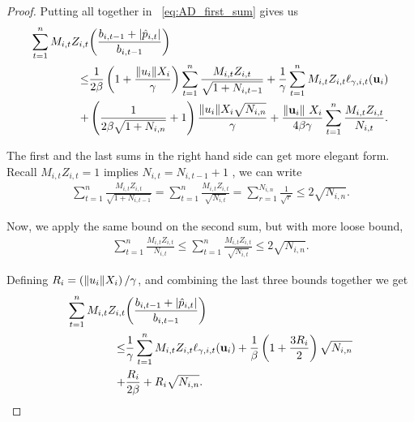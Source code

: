 {\begin{proof}
\noindent
Putting all together in ~\eqref{eq:AD_first_sum}  gives us
\begin{equation*}
\begin{split}
\sum_{t=1}^{n}M_{i,t}Z_{i,t}&{\left({\frac{b_{i,t-1} +\left\vert{\hat{p}_{i,t}}\right\vert}{b_{i,t-1}}}\right)}\\
\le &\frac{1}{2\beta}\left({1+\frac{\Vert u_i\Vert X_i}{\gamma}}\right)\sum_{t=1}^{n}{\frac{M_{i,t}Z_{i,t}}{\sqrt{1+N_{i,t-1}}}}
+\frac{1}{\gamma}\sum_{t=1}^{n}{M_{i,t}Z_{i,t}}\ell_{\gamma,i,t}(\mathbf{u}_i)\\
+&\left({\frac{1}{2\beta\sqrt{1+N_{i,n}}}+1}\right)\frac{{\Vert u_i\Vert}X_i\sqrt{N_{i,n}}}{\gamma}
+\frac{\Vert\mathbf{u}_i\Vert~ X_i}{4\beta\gamma}\sum_{t=1}^{n}{\frac{M_{i,t}Z_{i,t}}{N_{i,t}}}.
\end{split}
\end{equation*} 

\noindent
The first and the last sums in the right hand side can get more elegant form. Recall $M_{i,t}Z_{i,t}=1$ implies $N_{i,t}=N_{i,t-1}+1$ , we can write  
\begin{equation*}
\begin{split}
\sum_{t=1}^{n}{\frac{M_{i,t}Z_{i,t}}{\sqrt{1+N_{i,t-1}}}}
=\sum_{t=1}^{n}{\frac{M_{i,t}Z_{i,t}}{\sqrt{N_{i,t}}}}
=\sum_{r=1}^{N_{i,n}}{\frac{1}{\sqrt{r}}} 
\le 2\sqrt{N_{i,n}}.
\end{split}
\end{equation*}

\noindent
Now, we apply the same bound on the second sum, but with more loose bound, \begin{equation*}
\begin{split}
\sum_{t=1}^{n}{\frac{M_{i,t}Z_{i,t}}{N_{i,t}}}
\le\sum_{t=1}^{n}{\frac{M_{i,t}Z_{i,t}}{\sqrt{N_{i,t}}}} 
\le 2\sqrt{N_{i,n}}. 
\end{split}
\end{equation*}

\noindent
Defining $R_i=\left({\Vert u_i\Vert X_i}\right)/{\gamma}$, and combining the last three bounds together we get
\begin{equation*}
\begin{split}
\sum_{t=1}^{n}M_{i,t}Z_{i,t}&{\left({\frac{b_{i,t-1} +\left\vert{\hat{p}_{i,t}}\right\vert}{b_{i,t-1}}}\right)}\\
\le &\frac{1}{\gamma}\sum_{t=1}^{n}{M_{i,t}Z_{i,t}}\ell_{\gamma,i,t}(\mathbf{u}_i)
+\frac{1}{\beta}\left({1+\frac{3R_{i}}{2}}\right)\sqrt{N_{i,n}}
\\
+&\frac{R_i}{2\beta}+R_{i}\sqrt{N_{i,n}}.
\end{split}
\end{equation*}


\end{proof}}
